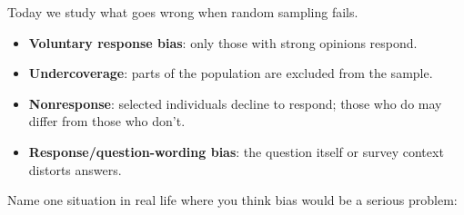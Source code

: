\documentclass[10pt]{article}
\begin{document}
\vspace{0.12in}

\noindent Today we study what goes wrong when random sampling fails.

\vspace{0.14in}

\begin{tcolorbox}[colback=greenbg, colframe=greenacc, boxrule=0.8pt, arc=2mm,
    left=4mm, right=4mm, top=3mm, bottom=3mm]
    \small
    \begin{itemize}[leftmargin=1.3em, itemsep=8pt]
  \item \textbf{Voluntary response bias}: only those with strong opinions respond.
  \item \textbf{Undercoverage}: parts of the population are excluded from the sample.
  \item \textbf{Nonresponse}: selected individuals decline to respond; those who
        do may differ from those who don't.
  \item \textbf{Response/question-wording bias}: the question itself or survey context
        distorts answers.
    \end{itemize}
\end{tcolorbox}

\vspace{0.2in}

\noindent\textcolor{slate}{\small Name one situation in real life where you think bias
would be a serious problem:}\\[8pt]
\writeline\\[2pt]\writeline
\end{document}
